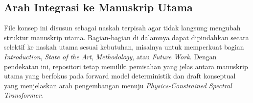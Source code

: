 \subsection{Arah Integrasi ke Manuskrip Utama}
File konsep ini disusun sebagai naskah terpisah agar tidak langsung mengubah struktur manuskrip utama. Bagian-bagian di dalamnya dapat dipindahkan secara selektif ke naskah utama sesuai kebutuhan, misalnya untuk memperkuat bagian \textit{Introduction}, \textit{State of the Art}, \textit{Methodology}, atau \textit{Future Work}. Dengan pendekatan ini, repositori tetap memiliki pemisahan yang jelas antara manuskrip utama yang berfokus pada forward model deterministik dan draft konseptual yang menjelaskan arah pengembangan menuju \textit{Physics-Constrained Spectral Transformer}.
